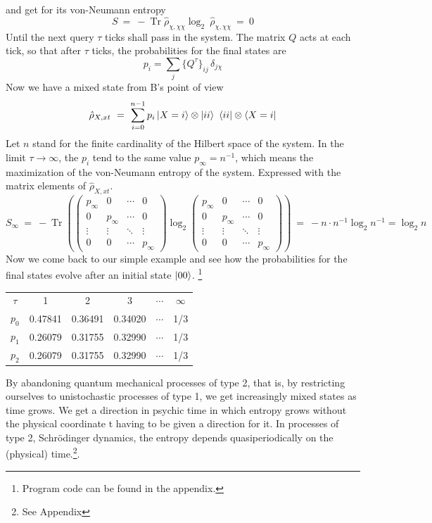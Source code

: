 \documentclass[12pt]{article}
\begin{document}
and get for its von-Neumann entropy
\begin{equation}
S\ =\ -\operatorname{Tr} \hat{\rho}_{\chi,\chi\chi} \log_2\ \hat{\rho}_{\chi,\chi\chi}\ = \ 0
\end{equation}
Until the next query $\tau$ ticks shall pass in the system. The matrix $Q$ acts at each tick, so that after $\tau$ ticks, the probabilities for the final states are
\begin{equation}
p_i=\sum_j \{Q^\tau\}_{ij}\, \delta_{j\chi}
\end{equation}
Now we have a mixed state from B's point of view
\begin{equation}
\hat{\rho}_{X,xt}\ = \ \sum_{i=0}^{n-1} p_i \ket{X=i}\otimes\ket{ii}\ \bra{ii}\otimes\bra{X=i} 
\end{equation}
Let $n$ stand for the finite cardinality of the Hilbert space of the system. In the limit $\tau\rightarrow\infty$, the $p_i$ tend to the same value $p_\infty=n^{-1}$, which means the maximization of the von-Neumann entropy of the system. Expressed with the matrix elements of $\hat{\rho}_{X,xt}$.
\begin{equation}
S_\infty\ =\ -\operatorname{Tr} \left(
\begin{pmatrix}
p_\infty&0&\cdots &0\\
0&p_\infty&\cdots &0\\
\vdots &\vdots &\ddots &\vdots \\
0&0&\cdots &p_\infty
\end{pmatrix}
\log_2
\begin{pmatrix}
p_\infty&0&\cdots &0\\
0&p_\infty&\cdots &0\\
\vdots &\vdots &\ddots &\vdots \\
0&0&\cdots &p_\infty
\end{pmatrix} \right)
\ =\ - n \cdot n^{-1} \log_2{n^{-1}} = \log_2{n}
\end{equation}
Now we come back to our simple example and see how the probabilities for the final states evolve after an initial state $\ket{00}$.
\footnote{Program code can be found in the appendix.}
\begin{center}
\begin{tabular}{ |c|c|c|c|c|c| } 
 \hline
 $\tau$ & 1 & 2 & 3 & $\cdots$ & $\infty$ \\ 
 $p_0$ & 0.47841 & 0.36491 & 0.34020 & $\cdots$ & 1/3 \\
 $p_1$ & 0.26079 & 0.31755 & 0.32990 & $\cdots$ & 1/3 \\
 $p_2$ & 0.26079 & 0.31755 & 0.32990 & $\cdots$ & 1/3 \\
 \hline
\end{tabular}
\end{center}
By abandoning quantum mechanical processes of type 2, that is, by restricting ourselves to unistochastic processes of type 1, we get increasingly mixed states as time grows. We get a direction in psychic time in which entropy grows without the physical coordinate t having to be given a direction for it. In processes of type 2, Schrödinger dynamics, the entropy depends quasiperiodically on the (physical) time.\footnote{See Appendix}.
\end{document}
